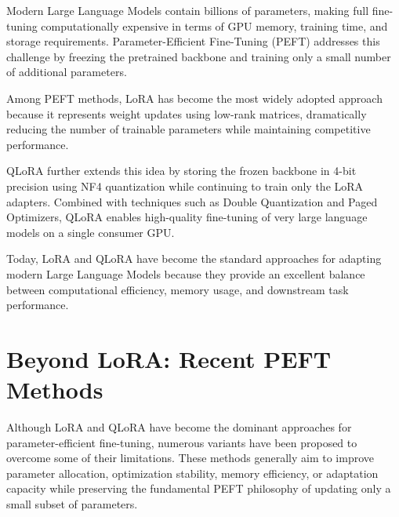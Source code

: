 Modern Large Language Models contain billions of parameters, making full fine-tuning computationally expensive in terms of GPU memory, training time, and storage requirements. Parameter-Efficient Fine-Tuning (PEFT) addresses this challenge by freezing the pretrained backbone and training only a small number of additional parameters.

Among PEFT methods, LoRA has become the most widely adopted approach because it represents weight updates using low-rank matrices, dramatically reducing the number of trainable parameters while maintaining competitive performance.

QLoRA further extends this idea by storing the frozen backbone in 4-bit precision using NF4 quantization while continuing to train only the LoRA adapters. Combined with techniques such as Double Quantization and Paged Optimizers, QLoRA enables high-quality fine-tuning of very large language models on a single consumer GPU.

Today, LoRA and QLoRA have become the standard approaches for adapting modern Large Language Models because they provide an excellent balance between computational efficiency, memory usage, and downstream task performance.


\section{Beyond LoRA: Recent PEFT Methods}

Although LoRA and QLoRA have become the dominant approaches for parameter-efficient fine-tuning, numerous variants have been proposed to overcome some of their limitations. These methods generally aim to improve parameter allocation, optimization stability, memory efficiency, or adaptation capacity while preserving the fundamental PEFT philosophy of updating only a small subset of parameters.

